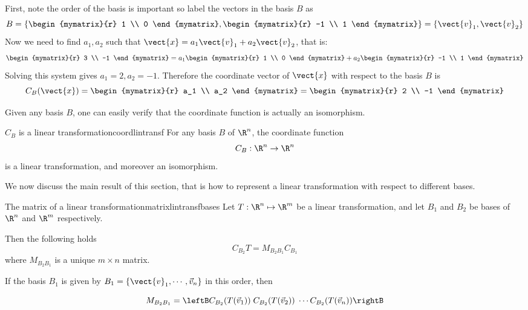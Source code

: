 \begin{solution}
First, note the order of the basis is important so label the vectors in the basis $B$ as 
\[
B = \left\{ \begin{mymatrix}{r}
1 \\
0 
\end{mymatrix}, \begin{mymatrix}{r}
-1 \\
1
\end{mymatrix} \right\} = \left\{ \vect{v}_1, \vect{v}_2 \right\} \]
Now we need to find $a_1, a_2$ such that $\vect{x} = a_1 \vect{v}_1 + a_2 \vect{v}_2$, that is:
\[
\begin{mymatrix}{r}
3 \\
-1
\end{mymatrix}
=
a_1 
\begin{mymatrix}{r}
1 \\
0 
\end{mymatrix}
+ a_2
\begin{mymatrix}{r}
-1 \\
1 
\end{mymatrix}\]
Solving this system gives $a_1 = 2, a_2 = -1$. Therefore the coordinate vector of $\vect{x}$ with respect to the basis $B$ is 
\[
C_B(\vect{x})
=
\begin{mymatrix}{r}
a_1 \\
a_2 
\end{mymatrix}
= \begin{mymatrix}{r}
2 \\
-1 
\end{mymatrix}
\]
\end{solution}

Given any basis $B$, one can easily verify that the coordinate function is actually an isomorphism. 

\begin{theorem}{$C_B$ is a linear transformation}{coordlintransf}
For any basis $B$ of $\R^n$, the coordinate function
\[ C_B: \R^n  \rightarrow \R^n  \]
is a linear transformation, and moreover an isomorphism. 
\end{theorem}

We now discuss the main  result  of this section, that is how
to represent a linear transformation with respect to different
bases.

\begin{theorem}{The matrix of a linear transformation}{matrixlintransfbases}
Let $T: \R^n \mapsto \R^m$ be a linear transformation,
and let $B_1$ and $B_2$ be bases of $\R^{n}$ and
$\R^{m}$ respectively.

Then the following holds
\begin{equation}
C_{B_2} T = M_{B_{2} B_{1}} C_{B_1}   \label{matrixequation}
\end{equation}
where $M_{B_{2} B_{1}}$  is a unique  $m \times n$  matrix.

If the basis $B_1$ is given by $B_1=\{ \vect{v}_1, \cdots, \vec{v}_n \}$ in this order, then 

\[  M_{B_{2} B_{1}} = \leftB C_{B_2}(T(\vec{v}_1)) \; C_{B_2}(T(\vec{v}_2)) \; \cdots C_{B_2}(T(\vec{v}_n)) \rightB \]
\end{theorem}

